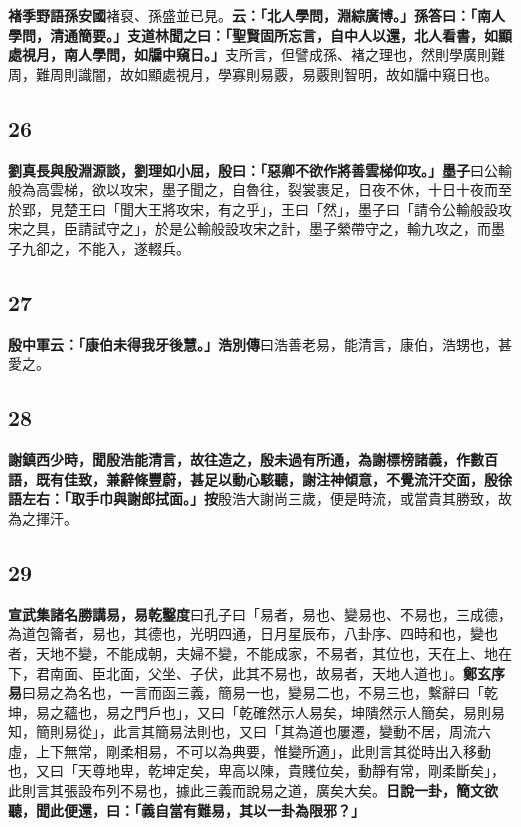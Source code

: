 \textbf{褚季野語孫安國}{\footnotesize 褚裒、孫盛並已見。}\textbf{云：「北人學問，淵綜廣博。」孫答曰：「南人學問，清通簡要。」支道林聞之曰：「聖賢固所忘言，自中人以還，北人看書，如顯處視月，南人學問，如牖中窺日。」}{\footnotesize 支所言，但譬成孫、褚之理也，然則學廣則難周，難周則識闇，故如顯處視月，學寡則易覈，易覈則智明，故如牖中窺日也。}

\subsection*{26}

\textbf{劉真長與殷淵源談，劉理如小屈，殷曰：「惡卿不欲作將善雲梯仰攻。」}{\footnotesize \textbf{墨子}曰公輸般為高雲梯，欲以攻宋，墨子聞之，自魯往，裂裳裹足，日夜不休，十日十夜而至於郢，見楚王曰「聞大王將攻宋，有之乎」，王曰「然」，墨子曰「請令公輸般設攻宋之具，臣請試守之」，於是公輸般設攻宋之計，墨子縈帶守之，輸九攻之，而墨子九卻之，不能入，遂輟兵。}

\subsection*{27}

\textbf{殷中軍云：「康伯未得我牙後慧。」}{\footnotesize \textbf{浩別傳}曰浩善老易，能清言，康伯，浩甥也，甚愛之。}

\subsection*{28}

\textbf{謝鎮西少時，聞殷浩能清言，故往造之，殷未過有所通，為謝標榜諸義，作數百語，既有佳致，兼辭條豐蔚，甚足以動心駭聽，謝注神傾意，不覺流汗交面，殷徐語左右：「取手巾與謝郎拭面。」}{\footnotesize \textbf{按}殷浩大謝尚三歲，便是時流，或當貴其勝致，故為之揮汗。}

\subsection*{29}

\textbf{宣武集諸名勝講易，}{\footnotesize \textbf{易乾鑿度}曰孔子曰「易者，易也、變易也、不易也，三成德，為道包籥者，易也，其德也，光明四通，日月星辰布，八卦序、四時和也，變也者，天地不變，不能成朝，夫婦不變，不能成家，不易者，其位也，天在上、地在下，君南面、臣北面，父坐、子伏，此其不易也，故易者，天地人道也」。\textbf{鄭玄序易}曰易之為名也，一言而函三義，簡易一也，變易二也，不易三也，繫辭曰「乾坤，易之蘊也，易之門戶也」，又曰「乾確然示人易矣，坤隤然示人簡矣，易則易知，簡則易從」，此言其簡易法則也，又曰「其為道也屢遷，變動不居，周流六虛，上下無常，剛柔相易，不可以為典要，惟變所適」，此則言其從時出入移動也，又曰「天尊地卑，乾坤定矣，卑高以陳，貴賤位矣，動靜有常，剛柔斷矣」，此則言其張設布列不易也，據此三義而說易之道，廣矣大矣。}\textbf{日說一卦，簡文欲聽，聞此便還，曰：「義自當有難易，其以一卦為限邪？」}


